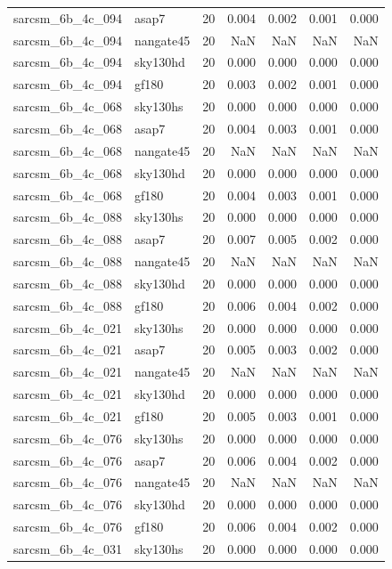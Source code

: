\begin{tabular}{llrrrrr}
sarcsm\_6b\_4c\_094 & asap7 & 20 & 0.004 & 0.002 & 0.001 & 0.000 \\
sarcsm\_6b\_4c\_094 & nangate45 & 20 & NaN & NaN & NaN & NaN \\
sarcsm\_6b\_4c\_094 & sky130hd & 20 & 0.000 & 0.000 & 0.000 & 0.000 \\
sarcsm\_6b\_4c\_094 & gf180 & 20 & 0.003 & 0.002 & 0.001 & 0.000 \\
sarcsm\_6b\_4c\_068 & sky130hs & 20 & 0.000 & 0.000 & 0.000 & 0.000 \\
sarcsm\_6b\_4c\_068 & asap7 & 20 & 0.004 & 0.003 & 0.001 & 0.000 \\
sarcsm\_6b\_4c\_068 & nangate45 & 20 & NaN & NaN & NaN & NaN \\
sarcsm\_6b\_4c\_068 & sky130hd & 20 & 0.000 & 0.000 & 0.000 & 0.000 \\
sarcsm\_6b\_4c\_068 & gf180 & 20 & 0.004 & 0.003 & 0.001 & 0.000 \\
sarcsm\_6b\_4c\_088 & sky130hs & 20 & 0.000 & 0.000 & 0.000 & 0.000 \\
sarcsm\_6b\_4c\_088 & asap7 & 20 & 0.007 & 0.005 & 0.002 & 0.000 \\
sarcsm\_6b\_4c\_088 & nangate45 & 20 & NaN & NaN & NaN & NaN \\
sarcsm\_6b\_4c\_088 & sky130hd & 20 & 0.000 & 0.000 & 0.000 & 0.000 \\
sarcsm\_6b\_4c\_088 & gf180 & 20 & 0.006 & 0.004 & 0.002 & 0.000 \\
sarcsm\_6b\_4c\_021 & sky130hs & 20 & 0.000 & 0.000 & 0.000 & 0.000 \\
sarcsm\_6b\_4c\_021 & asap7 & 20 & 0.005 & 0.003 & 0.002 & 0.000 \\
sarcsm\_6b\_4c\_021 & nangate45 & 20 & NaN & NaN & NaN & NaN \\
sarcsm\_6b\_4c\_021 & sky130hd & 20 & 0.000 & 0.000 & 0.000 & 0.000 \\
sarcsm\_6b\_4c\_021 & gf180 & 20 & 0.005 & 0.003 & 0.001 & 0.000 \\
sarcsm\_6b\_4c\_076 & sky130hs & 20 & 0.000 & 0.000 & 0.000 & 0.000 \\
sarcsm\_6b\_4c\_076 & asap7 & 20 & 0.006 & 0.004 & 0.002 & 0.000 \\
sarcsm\_6b\_4c\_076 & nangate45 & 20 & NaN & NaN & NaN & NaN \\
sarcsm\_6b\_4c\_076 & sky130hd & 20 & 0.000 & 0.000 & 0.000 & 0.000 \\
sarcsm\_6b\_4c\_076 & gf180 & 20 & 0.006 & 0.004 & 0.002 & 0.000 \\
sarcsm\_6b\_4c\_031 & sky130hs & 20 & 0.000 & 0.000 & 0.000 & 0.000 \\

\end{tabular}
